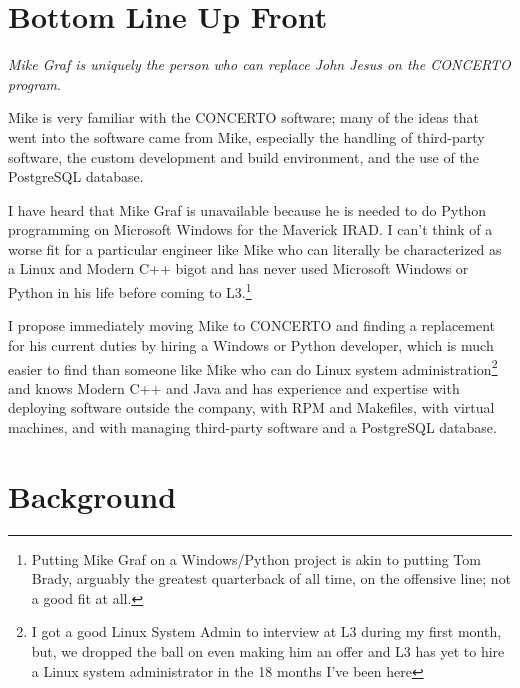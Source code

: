 \documentclass[letterpaper,11pt]{texMemo} %
\begin{document}
\maketitle %


\section*{Bottom Line Up Front}

\emph{Mike Graf is uniquely the person who can replace John Jesus on the CONCERTO program}.

Mike is very familiar with the CONCERTO software; many of the ideas that went into the software came from Mike, especially the handling of third-party software, the custom development and build environment, and the use of the PostgreSQL database.

I have heard that Mike Graf is unavailable because he is needed to do Python programming on Microsoft Windows for the Maverick IRAD.
I can't think of a worse fit for a particular engineer like Mike who can literally be characterized as a Linux and Modern C++ bigot and has never used Microsoft Windows or Python in his life before coming to L3.\footnote{Putting Mike Graf on a Windows/Python project is akin to putting Tom Brady, arguably the greatest quarterback of all time, on the offensive line; not a good fit at all.}

I propose immediately moving Mike to CONCERTO and finding a replacement for his current duties by hiring a Windows or Python developer, which is much easier to find than someone like Mike who can do Linux system administration\footnote{I got a good Linux System Admin to interview at L3 during my first month, but, we dropped the ball on even making him an offer and L3 has yet to hire a Linux system administrator in the 18 months I've been here} and knows Modern C++ and Java and has experience and expertise with deploying software outside the company, with RPM and Makefiles, with virtual machines, and with managing third-party software and a PostgreSQL database.


\section*{Background}
\end{document}
